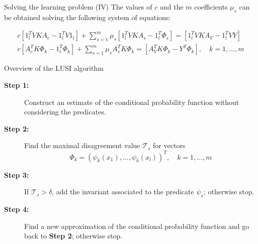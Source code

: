 \documentclass[10pt, dvipsnames]{beamer}
\newcommand{\Tau}{\mathcal{T}}
\begin{document}
\begin{frame}{Solving the learning problem (IV)}
    The values of $c$ and the $m$ coefficients $\mu_s$ can be obtained solving the following system of equations:

    \begin{equation*}
        \begin{gathered}
            c [1_l^T VKA_c - 1_l^T V 1_l] + \sum_{s=1}^m \mu_s [1_l^T VKA_s - 1_l^T \Phi_s] = [1_l^T VKA_V - 1_l^T V Y] \\
            c [A_c^TK\Phi_k - 1_l^T\Phi_k] + \sum_{s=1}^m \mu_s A_s^T K \Phi_k = [A_V^T K \Phi_k - Y^T \Phi_k],\quad k=1, \dots, m
        \end{gathered}
    \end{equation*}
\end{frame}

\begin{frame}{Overview of the LUSI algorithm}
    \begin{description}
        \item[\textbf{Step 1:}] Construct an estimate of the conditional probability function
        without considering the predicates.
        \item[\textbf{Step 2:}] Find the maximal disagreement value $\Tau_s$  for vectors
        \[
            \Phi_k = (\psi_k(x_1), \dots, \psi_k(x_l))^T,\quad k=1, \dots, m
        \]
        \item[\textbf{Step 3:}] If $\Tau_s > \delta$, add the invariant associated to the predicate $\psi_s$; otherwise stop.
        \item[\textbf{Step 4:}] Find a new approximation of the conditional probability function and go back to \textbf{Step 2};
        otherwise stop.
    \end{description}
\end{frame}
\end{document}
